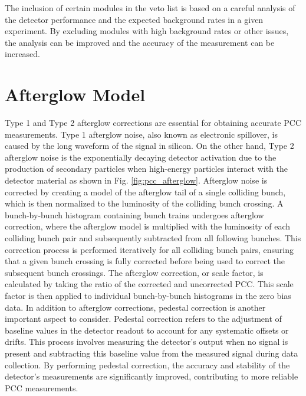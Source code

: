 The inclusion of certain modules in the veto list is based on a careful analysis of the detector performance and the expected background rates in a given experiment. By excluding modules with high background rates or other issues, the analysis can be improved and the accuracy of the measurement can be increased.


\section{Afterglow Model}

Type 1 and Type 2 afterglow corrections are essential for obtaining accurate PCC measurements. Type 1 afterglow noise, also known as electronic spillover, is caused by the long waveform of the signal in silicon. On the other hand, Type 2 afterglow noise is the exponentially decaying detector activation due to the production of secondary particles when high-energy particles interact with the detector material as shown in Fig. \ref{fig:pcc_afterglow}. Afterglow noise is corrected by creating a model of the afterglow tail of a single colliding bunch, which is then normalized to the luminosity of the colliding bunch crossing. A bunch-by-bunch histogram containing bunch trains undergoes afterglow correction, where the afterglow model is multiplied with the luminosity of each colliding bunch pair and subsequently subtracted from all following bunches. This correction process is performed iteratively for all colliding bunch pairs, ensuring that a given bunch crossing is fully corrected before being used to correct the subsequent bunch crossings. The afterglow correction, or scale factor, is calculated by taking the ratio of the corrected and uncorrected PCC. This scale factor is then applied to individual bunch-by-bunch histograms in the zero bias data. In addition to afterglow corrections, pedestal correction is another important aspect to consider. Pedestal correction refers to the adjustment of baseline values in the detector readout to account for any systematic offsets or drifts. This process involves measuring the detector's output when no signal is present and subtracting this baseline value from the measured signal during data collection. By performing pedestal correction, the accuracy and stability of the detector's measurements are significantly improved, contributing to more reliable PCC measurements.

